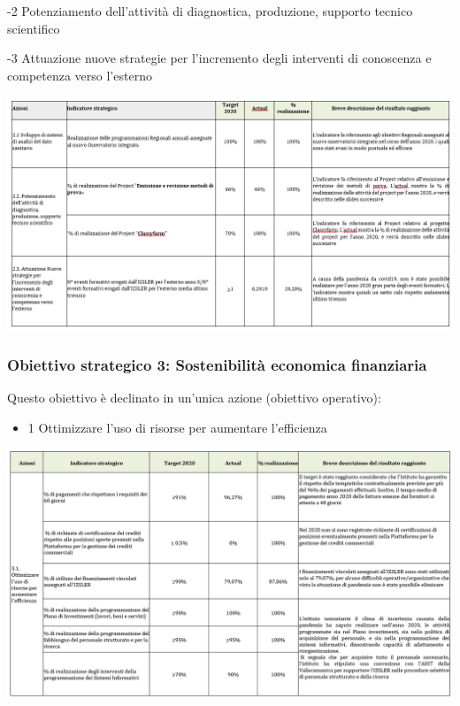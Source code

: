 \documentclass[
  12pt,
]{article}
\providecommand{\tightlist}{%
  \setlength{\itemsep}{0pt}\setlength{\parskip}{0pt}}
\begin{document}
-2 Potenziamento dell'attività di diagnostica, produzione, supporto
tecnico scientifico

-3 Attuazione nuove strategie per l'incremento degli interventi di
conoscenza e competenza verso l'esterno

\begin{center}\includegraphics[width=1.1\linewidth]{figure/ob2} \end{center}

\newpage

\hypertarget{obiettivo-strategico-3-sostenibilituxe0-economica-finanziaria}{%
\subsubsection*{\texorpdfstring{Obiettivo strategico 3:
\textbf{Sostenibilità economica
finanziaria}}{Obiettivo strategico 3: Sostenibilità economica finanziaria}}\label{obiettivo-strategico-3-sostenibilituxe0-economica-finanziaria}}

Questo obiettivo è declinato in un'unica azione (obiettivo operativo):

\begin{itemize}
\tightlist
\item
  1 Ottimizzare l'uso di risorse per aumentare l'efficienza
\end{itemize}

\begin{center}\includegraphics[width=1.1\linewidth]{figure/ob3} \end{center}
\end{document}
